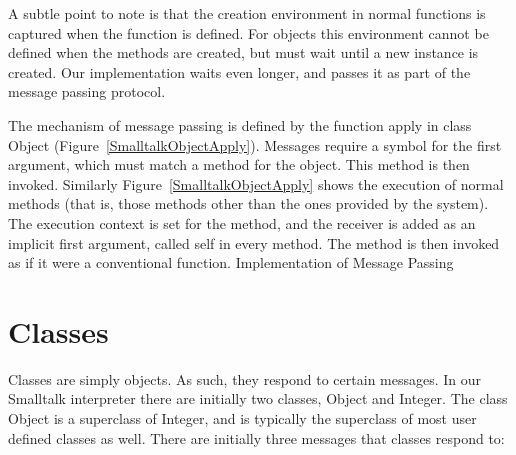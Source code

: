 A subtle point to note is that the creation environment in normal functions is
captured when the function is defined.  For objects this environment cannot be
defined when the methods are created, but must wait until a new instance is
created.  Our implementation waits even longer, and passes it as part of the
message passing protocol.

The mechanism of message passing is defined by the function {\sf apply} in class
{\sf Object} (Figure~\ref{SmalltalkObjectApply}).  Messages require a symbol for
the first argument, which must match a method for the object.  This method is
then invoked.  Similarly Figure~\ref{SmalltalkObjectApply} shows the execution
of normal methods (that is, those methods other than the ones provided by the
system).  The execution context is set for the method, and the receiver is added
as an implicit first argument, called {\sf self} in every method.  The method is
then invoked as if it were a conventional function.
%
{Implementation of Message Passing}

\section{Classes}

Classes are simply objects.  As such, they respond to certain messages.  In our
Smalltalk interpreter there are initially two classes, {\sf Object} and {\sf
    Integer}.  The class {\sf Object} is a superclass of {\sf Integer}, and is
typically the superclass of most user defined classes as well.  There are
initially three messages that classes respond to:

